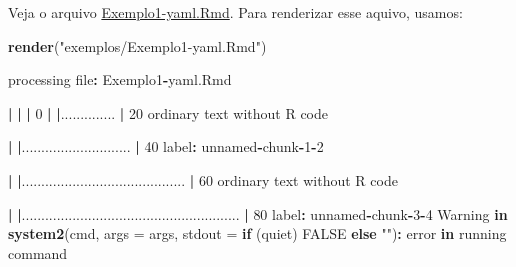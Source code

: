 \documentclass[10pt,a4paper]{book}
\newenvironment{Shaded}{\begin{snugshade}}{\end{snugshade}}
\newcommand{\KeywordTok}[1]{\textcolor[rgb]{0.13,0.29,0.53}{\textbf{#1}}}
\newcommand{\DataTypeTok}[1]{\textcolor[rgb]{0.13,0.29,0.53}{#1}}
\newcommand{\DecValTok}[1]{\textcolor[rgb]{0.00,0.00,0.81}{#1}}
\newcommand{\StringTok}[1]{\textcolor[rgb]{0.31,0.60,0.02}{#1}}
\newcommand{\OtherTok}[1]{\textcolor[rgb]{0.56,0.35,0.01}{#1}}
\newcommand{\ControlFlowTok}[1]{\textcolor[rgb]{0.13,0.29,0.53}{\textbf{#1}}}
\newcommand{\OperatorTok}[1]{\textcolor[rgb]{0.81,0.36,0.00}{\textbf{#1}}}
\newcommand{\ErrorTok}[1]{\textcolor[rgb]{0.64,0.00,0.00}{\textbf{#1}}}
\newcommand{\NormalTok}[1]{#1}
\begin{document}
Veja o arquivo \href{exemplos/Exemplo1-yaml.Rmd}{Exemplo1-yaml.Rmd}.
Para renderizar esse aquivo, usamos:

\begin{Shaded}
\begin{Highlighting}[]
\KeywordTok{render}\NormalTok{(}\StringTok{"exemplos/Exemplo1-yaml.Rmd"}\NormalTok{)}


\NormalTok{processing file}\OperatorTok{:}\StringTok{ }\NormalTok{Exemplo1}\OperatorTok{-}\NormalTok{yaml.Rmd}

  \OperatorTok{|}\StringTok{                                                                            }
\StringTok{  }\ErrorTok{|}\StringTok{                                                                      }\ErrorTok{|}\StringTok{   }\DecValTok{0}\NormalTok{%
  \OperatorTok{|}\StringTok{                                                                            }
\StringTok{  }\ErrorTok{|}\NormalTok{..............                                                        }\OperatorTok{|}\StringTok{  }\DecValTok{20}\NormalTok{%
\NormalTok{  ordinary text without R code}


  \OperatorTok{|}\StringTok{                                                                            }
\StringTok{  }\ErrorTok{|}\NormalTok{............................                                          }\OperatorTok{|}\StringTok{  }\DecValTok{40}\NormalTok{%
\NormalTok{label}\OperatorTok{:}\StringTok{ }\NormalTok{unnamed}\OperatorTok{-}\NormalTok{chunk}\OperatorTok{-}\DecValTok{1}\OperatorTok{-}\DecValTok{2}

  \OperatorTok{|}\StringTok{                                                                            }
\StringTok{  }\ErrorTok{|}\NormalTok{..........................................                            }\OperatorTok{|}\StringTok{  }\DecValTok{60}\NormalTok{%
\NormalTok{  ordinary text without R code}


  \OperatorTok{|}\StringTok{                                                                            }
\StringTok{  }\ErrorTok{|}\NormalTok{........................................................              }\OperatorTok{|}\StringTok{  }\DecValTok{80}\NormalTok{%
\NormalTok{label}\OperatorTok{:}\StringTok{ }\NormalTok{unnamed}\OperatorTok{-}\NormalTok{chunk}\OperatorTok{-}\DecValTok{3}\OperatorTok{-}\DecValTok{4}
\NormalTok{Warning }\ControlFlowTok{in} \KeywordTok{system2}\NormalTok{(cmd, }\DataTypeTok{args =}\NormalTok{ args, }\DataTypeTok{stdout =} \ControlFlowTok{if}\NormalTok{ (quiet) }\OtherTok{FALSE} \ControlFlowTok{else} \StringTok{""}\NormalTok{)}\OperatorTok{:}\StringTok{ }\NormalTok{error}
\ControlFlowTok{in}\NormalTok{ running command}

}}}}}
\end{Highlighting}
\end{Shaded}
\end{document}
